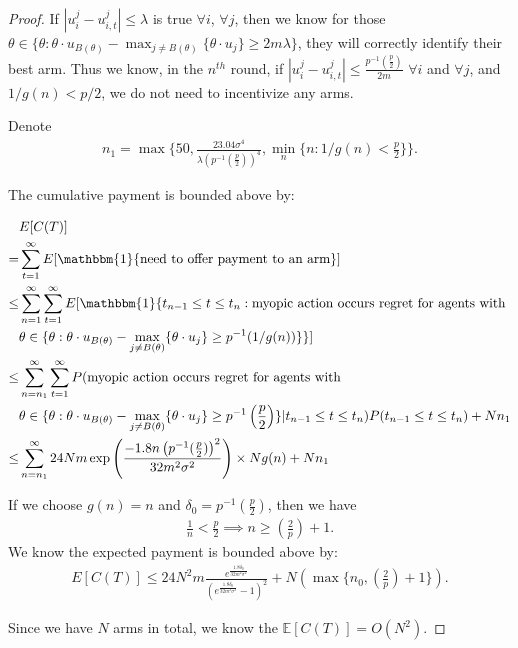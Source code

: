 \documentclass{article}
\begin{document}
\begin{proof}
If $|u_{i}^{j}-u_{i,t}^{j}|\leq \lambda$ is true $\forall i$, $\forall j$, then we know for those $\theta\in \{\theta:\theta\cdot u_{B(\theta)}-\max_{j\neq B(\theta)}\{\theta \cdot u_{j}\}\geq 2m\lambda\}$, they will correctly identify their best arm. Thus we know, in the $n^{th}$ round, if $|u_{i}^{j}-u_{i,t}^{j}|\leq \frac{p^{-1}(\frac{p}{2})}{2m}$ $\forall i$ and $\forall j$, and $1/g(n)<p/2$, we do not need to incentivize any arms.

Denote 
\begin{align}
n_{1}=\max\bigg\{50, \frac{23.04\sigma^4}{\lambda\left(p^{-1}(\frac{p}{2})\right)^4},\min_{n}\{n:1/g(n)<\frac{p}{2}\}\bigg\}. \nonumber
\end{align}

The cumulative payment is bounded above by:

\begin{align}
&E[C(T)] \nonumber \\
= & \sum_{t=1}^{\infty}E[\mathbbm{1}\{\text{need to offer payment to an arm}\}] \nonumber \\
\leq &\sum_{n=1}^{\infty}\sum_{t=1}^{\infty}E[\mathbbm{1}\{t_{n-1}\leq t\leq t_{n}: \text{myopic action occurs regret for agents with } \nonumber \\
&\theta\in \{\theta:\theta\cdot u_{B(\theta)}-\max_{j\neq B(\theta)}\{\theta \cdot u_{j}\}\geq p^{-1}(1/g(n))\}\}] \nonumber \\
\leq &\sum_{n=n_{1}}^{\infty}\sum_{t=1}^{\infty}P(\text{myopic action occurs regret for agents with }\nonumber \\
&\theta\in \{\theta:\theta\cdot u_{B(\theta)}-\max_{j\neq B(\theta)}\{\theta \cdot u_{j}\}\geq p^{-1}\left(\frac{p}{2}\right)\}|t_{n-1}\leq t\leq t_{n})P(t_{n-1}\leq t\leq t_{n})+Nn_{1} \nonumber \\
\leq & \sum_{n=n_{1}}^{\infty}24Nm \exp\left(\frac{-1.8 n\left(p^{-1}(\frac{p}{2})\right)^2}{32m^2\sigma^2}\right)\times Ng(n)+Nn_{1} \nonumber 
\end{align}

If we choose $g(n)=n$ and $\delta_{0}=p^{-1}(\frac{p}{2})$, then we have
\begin{align}
\frac{1}{n}<\frac{p}{2} \implies n\geq (\frac{2}{p})+1. \nonumber
\end{align}
We know the expected payment is bounded above by:
\begin{align}
E[C(T)] \leq 24N^2 m \frac{e^{\frac{1.8\delta_{0}}{32m^2\sigma^2}}}{(e^{\frac{1.8\delta_{0}}{32m^2\sigma^2}}-1)^2}+N(\max\{n_{0},(\frac{2}{p})+1\}). \nonumber
\end{align}

Since we have $N$ arms in total, we know the $\mathbb{E}[C(T)]=O(N^2)$.\end{proof}
\end{document}
